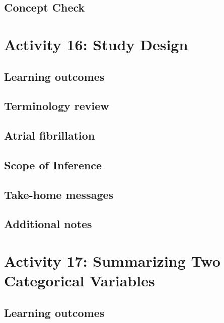 \documentclass[
]{report}
\begin{document}
\subsection{Concept Check}\label{concept-check-7}

\section{Activity 16: Study Design}\label{activity-16-study-design}

\subsection{Learning outcomes}\label{learning-outcomes-17}

\subsection{Terminology review}\label{terminology-review-14}

\subsection{Atrial fibrillation}\label{atrial-fibrillation}

\subsection{Scope of Inference}\label{scope-of-inference-2}

\subsection{Take-home messages}\label{take-home-messages-15}

\subsection{Additional notes}\label{additional-notes-15}

\section{Activity 17: Summarizing Two Categorical Variables}\label{activity-17-summarizing-two-categorical-variables}

\subsection{Learning outcomes}\label{learning-outcomes-18}
\end{document}
